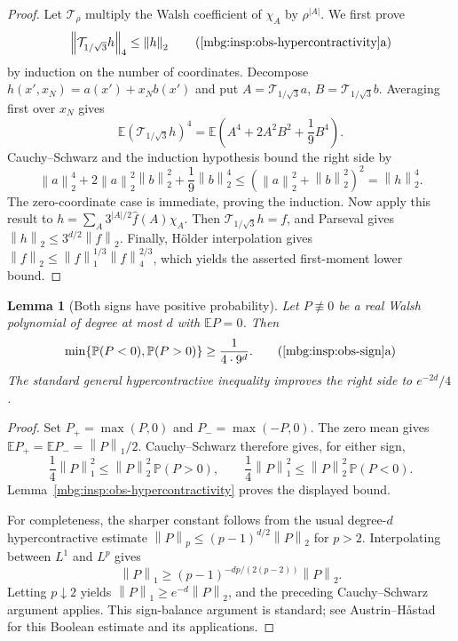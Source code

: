 \documentclass[11pt,letterpaper]{article}
\newtheorem{lemma}[theorem]{Lemma}
\theoremstyle{definition}
\newcommand{\E}{\mathbb E}
\newcommand{\Prb}{\mathbb P}
\newcommand{\norm}[1]{\left\lVert #1\right\rVert}
\begin{document}
\begin{proof}
Let $\mathcal T_\rho$ multiply the Walsh coefficient of $\chi_A$ by
$\rho^{|A|}$.  We first prove
\[
 \norm{\mathcal T_{1/\sqrt3}h}_4\le\norm{h}_2
 \tag{\ref{mbg:insp:obs-hypercontractivity}a}
\]
by induction on the number of coordinates.  Decompose
$h(x',x_N)=a(x')+x_Nb(x')$ and put
$A=\mathcal T_{1/\sqrt3}a$, $B=\mathcal T_{1/\sqrt3}b$.
Averaging first over $x_N$ gives
\[
 \E(\mathcal T_{1/\sqrt3}h)^4
 =\E\left(A^4+2A^2B^2+\frac19B^4\right).
\]
Cauchy--Schwarz and the induction hypothesis bound the right side by
\[
 \norm{a}_2^4+2\norm{a}_2^2\norm{b}_2^2
       +\frac19\norm{b}_2^4
 \le (\norm{a}_2^2+\norm{b}_2^2)^2
 =\norm{h}_2^4.
\]
The zero-coordinate case is immediate, proving the induction.
Now apply this result to
$h=\sum_A3^{|A|/2}\widehat f(A)\chi_A$.
Then $\mathcal T_{1/\sqrt3}h=f$, and Parseval gives
$\norm{h}_2\le3^{d/2}\norm{f}_2$.
Finally, H\"older interpolation gives
$\norm{f}_2\le\norm{f}_1^{1/3}\norm{f}_4^{2/3}$,
which yields the asserted first-moment lower bound.
\end{proof}

\begin{lemma}[Both signs have positive probability]
\label{mbg:insp:obs-sign}
Let $P\not\equiv0$ be a real Walsh polynomial of degree at most $d$
with $\E P=0$.  Then
\[
 \min\{\Prb(P<0),\Prb(P>0)\}
 \ge \frac{1}{4\cdot9^d}.
 \tag{\ref{mbg:insp:obs-sign}a}
\]
The standard general hypercontractive inequality improves the right
side to $e^{-2d}/4$.
\end{lemma}

\begin{proof}
Set $P_+=\max(P,0)$ and $P_-=\max(-P,0)$.
The zero mean gives
$\E P_+=\E P_-=\norm{P}_1/2$.
Cauchy--Schwarz therefore gives, for either sign,
\[
 \frac14\norm{P}_1^2
 \le \norm{P}_2^2\,\Prb(P>0),
 \qquad
 \frac14\norm{P}_1^2
 \le \norm{P}_2^2\,\Prb(P<0).
\]
Lemma~\ref{mbg:insp:obs-hypercontractivity} proves the displayed bound.

For completeness, the sharper constant follows from the usual
degree-$d$ hypercontractive estimate
$\norm{P}_p\le(p-1)^{d/2}\norm{P}_2$ for $p>2$.
Interpolating between $L^1$ and $L^p$ gives
\[
 \norm{P}_1
 \ge (p-1)^{-dp/(2(p-2))}\norm{P}_2.
\]
Letting $p\downarrow2$ yields
$\norm{P}_1\ge e^{-d}\norm{P}_2$, and the preceding
Cauchy--Schwarz argument applies.  This sign-balance argument is
standard; see Austrin--H\aa stad
\cite[Theorem~2.6 and Corollary~4.2]{insp:AustrinHastadSTOC}
for this Boolean estimate and its applications.
\end{proof}
\end{document}
